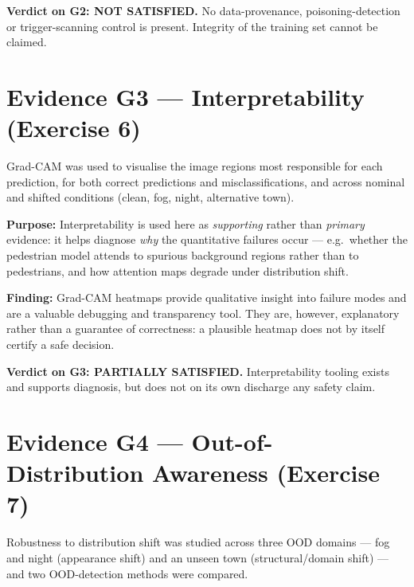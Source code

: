 \documentclass[11pt,a4paper]{article}
\newcommand{\claim}[2]{\vspace{2pt}\noindent\textbf{\color{claimblue}#1:} #2\par\vspace{2pt}}
\begin{document}
\begin{tcolorbox}[colback=warnred!8,colframe=warnred]
\textbf{Verdict on G2: NOT SATISFIED.} No data-provenance, poisoning-detection or
trigger-scanning control is present. Integrity of the training set cannot be
claimed.
\end{tcolorbox}

\section{Evidence G3 --- Interpretability (Exercise 6)}
Grad-CAM was used to visualise the image regions most responsible for each
prediction, for both correct predictions and misclassifications, and across
nominal and shifted conditions (clean, fog, night, alternative town).

\claim{Purpose}{Interpretability is used here as \emph{supporting} rather than
\emph{primary} evidence: it helps diagnose \emph{why} the quantitative failures
occur --- e.g.\ whether the pedestrian model attends to spurious background
regions rather than to pedestrians, and how attention maps degrade under
distribution shift.}

\claim{Finding}{Grad-CAM heatmaps provide qualitative insight into failure modes
and are a valuable debugging and transparency tool. They are, however,
explanatory rather than a guarantee of correctness: a plausible heatmap does not
by itself certify a safe decision.}

\begin{tcolorbox}[colback=orange!8,colframe=orange!70!black]
\textbf{Verdict on G3: PARTIALLY SATISFIED.} Interpretability tooling exists and
supports diagnosis, but does not on its own discharge any safety claim.
\end{tcolorbox}

\section{Evidence G4 --- Out-of-Distribution Awareness (Exercise 7)}
Robustness to distribution shift was studied across three OOD domains --- fog and
night (appearance shift) and an unseen town (structural/domain shift) --- and two
OOD-detection methods were compared.
\end{document}
